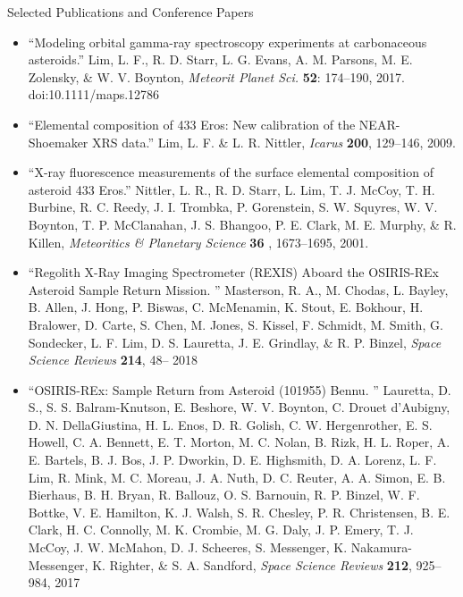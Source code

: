 \documentclass[11pt,oneside]{article}
\newenvironment{ressection}[1]{
	\vspace{4pt}
	{\Large#1}
	\begin{itemize}
	\vspace{3pt}
}{
	\end{itemize}
}
\newcommand{\resitem}[1]{
	\vspace{-4pt}
	\item \begin{flushleft} #1 \end{flushleft}
}
\begin{document}

\begin{ressection}{Selected Publications and Conference Papers}


\resitem{ ``Modeling orbital gamma-ray spectroscopy experiments at carbonaceous asteroids.''
  Lim, L. F., R. D. 
Starr, L. G. Evans, A. M. Parsons, M. E. Zolensky, 
\& W. V. Boynton,  {\it Meteorit Planet Sci.} {\bf 52}: 174--190, 2017. doi:10.1111/maps.12786
}

\resitem{ ``Elemental composition of 433 Eros: New calibration of the NEAR-Shoemaker 
XRS data.'' Lim, L. F. 
\& L. R. Nittler,  {\it Icarus} {\bf 200}, 129--146, 2009.  
}

\resitem{ ``X-ray fluorescence measurements of the surface elemental composition of 
asteroid 433 Eros.'' Nittler, L. R., R. D. Starr, L. Lim, T. J. McCoy, T. 
H. Burbine, R. C. Reedy, J. I. Trombka, P. Gorenstein, S. W. Squyres, W. V. 
Boynton, T. P. McClanahan, J. S. Bhangoo, P. E. Clark, M. E. Murphy, 
\& R. Killen,  {\it Meteoritics \& Planetary Science} {\bf 36 }, 1673--1695, 2001.  
}

\resitem{``Regolith X-Ray Imaging Spectrometer (REXIS) Aboard the 
OSIRIS-REx Asteroid Sample Return Mission. '' Masterson, R. A., M. Chodas, 
L. Bayley, B. Allen, J. Hong, P. Biswas, C. McMenamin, K. Stout, E. 
Bokhour, H. Bralower, D. Carte, S. Chen, M. Jones, S. Kissel, F. Schmidt, 
M. Smith, G. Sondecker, L. F. Lim, D. S. Lauretta, J. E. Grindlay, 
\& R. P. Binzel,  {\it Space Science Reviews} {\bf 214}, 48-- 2018} 

\resitem{``OSIRIS-REx: Sample Return from Asteroid (101955) Bennu. '' 
Lauretta, D. S., S. S. Balram-Knutson, E. Beshore, W. V. Boynton, C. Drouet 
d'Aubigny, D. N. DellaGiustina, H. L. Enos, D. R. Golish, C. W. 
Hergenrother, E. S. Howell, C. A. Bennett, E. T. Morton, M. C. Nolan, B. 
Rizk, H. L. Roper, A. E. Bartels, B. J. Bos, J. P. Dworkin, D. E. 
Highsmith, D. A. Lorenz, L. F. Lim, R. Mink, M. C. Moreau, J. A. Nuth, D. 
C. Reuter, A. A. Simon, E. B. Bierhaus, B. H. Bryan, R. Ballouz, O. S. 
Barnouin, R. P. Binzel, W. F. Bottke, V. E. Hamilton, K. J. Walsh, S. R. 
Chesley, P. R. Christensen, B. E. Clark, H. C. Connolly, M. K. Crombie, M. 
G. Daly, J. P. Emery, T. J. McCoy, J. W. McMahon, D. J. Scheeres, S. 
Messenger, K. Nakamura-Messenger, K. Righter, 
\& S. A. Sandford,  {\it Space Science Reviews} {\bf 212}, 925--984,  2017} 



\end{ressection}
\end{document}

